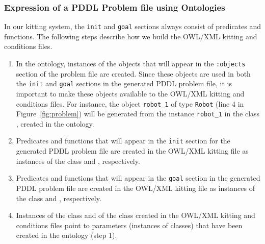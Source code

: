 \subsubsection{Expression of a PDDL Problem file using Ontologies}
In our kitting system, the \texttt{init} and \texttt{goal} sections always consist of predicates and functions. The following steps describe how we build the OWL/XML kitting  and  conditions files.
\begin{enumerate}
 \item In the  ontology, instances of the objects that will appear in the \texttt{:objects} section of the problem file are created. Since these objects are used in both the \texttt{init} and \texttt{goal} sections in the generated PDDL problem file, it is important to make these objects available to the OWL/XML kitting  and  conditions files. For instance, the object \texttt{robot\_1} of type \texttt{Robot} (line 4 in Figure~\ref{fig:problem}) will be generated from the instance \texttt{robot\_1} in the class , created in the  ontology.
 \item Predicates and functions that will appear in the \texttt{init} section for the generated PDDL problem file are created in the OWL/XML kitting  file as instances of the class  and , respectively.
 \item Predicates and functions that will appear in the \texttt{goal} section in the generated PDDL problem file are created in the OWL/XML kitting  file as instances of the class  and , respectively.
 \item Instances of the class  and of the class  created in the OWL/XML kitting  and  conditions files point to parameters (instances of classes) that have been created in the  ontology (step 1).
\end{enumerate}


